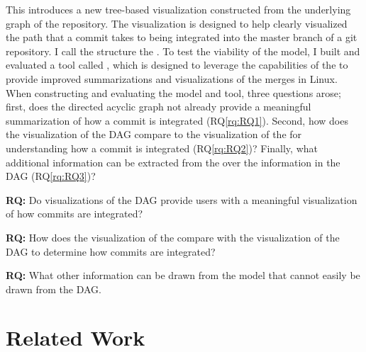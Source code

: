 This \paper{} introduces a new tree-based visualization constructed from
the underlying graph of the repository. The visualization is designed to
help clearly visualized the path that a commit takes to being integrated
into the master branch of a git repository. I call the structure the
\mt{}. To test the viability of the model, I built and evaluated a tool
called \tool{}, which is designed to leverage the capabilities of the
\mt{} to provide improved summarizations and visualizations of the
merges in Linux. When constructing and evaluating the model and tool,
three questions arose; first, does the directed acyclic graph not
already provide a meaningful summarization of how a commit is integrated
(RQ\ref{rq:RQ1}). Second, how does the visualization of the DAG compare
to the visualization of the \mt{} for understanding how a commit is
integrated (RQ\ref{rq:RQ2})? Finally, what additional information can be
extracted from the \mt{} over the information in the DAG
(RQ\ref{rq:RQ3})?

\begin{textbox}
  \textbf{RQ:} Do visualizations of the DAG provide
  users with a meaningful visualization of how commits are integrated?
\end{textbox}


\begin{textbox}
  \textbf{RQ:} How does the visualization of the \mt{}
  compare with the visualization of the DAG to determine how commits are
  integrated?
\end{textbox}

\begin{textbox}
  \textbf{RQ:} What other information can be drawn from the
  \mt{} model that cannot easily be drawn from the DAG.
\end{textbox}


\section{Related Work}\label{sec:related_work}

